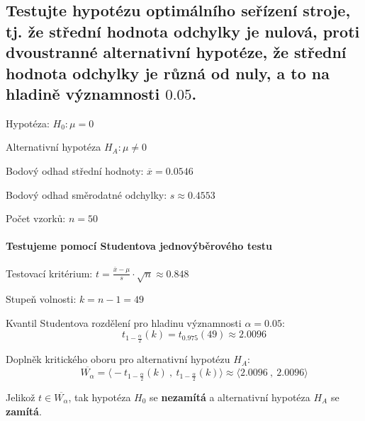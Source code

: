 
\subsection{Testujte hypotézu optimálního seřízení stroje, tj. že střední hodnota odchylky je nulová, proti dvoustranné alternativní hypotéze, že střední hodnota odchylky je různá od nuly, a to na hladině významnosti $0.05$.}

\begin{compactitem}
    \item Hypotéza: ${\displaystyle H_0 : \mu = 0}$

    \item Alternativní hypotéza ${\displaystyle H_{A} : \mu \neq 0}$

    \item Bodový odhad střední hodnoty: ${\displaystyle \overline{x} = 0.0546}$

    \item Bodový odhad směrodatné odchylky: ${\displaystyle s \approx 0.4553}$

    \item Počet vzorků: ${\displaystyle n = 50}$
\end{compactitem}

\paragraph*{Testujeme pomocí Studentova jednovýběrového testu}

\begin{compactitem}
    \item Testovací kritérium: ${\displaystyle t = \frac{\overline{x} - \mu}{s} \cdot \sqrt{n} \approx 0.848}$

    \item Stupeň volnosti: ${\displaystyle k = n - 1 = 49}$

    \item Kvantil Studentova rozdělení pro hladinu významnosti ${\displaystyle \alpha = 0.05}$:
    $${\displaystyle \qquad t_{1 - \frac{\alpha}{2}}(k) = t_{0.975}(49) \approx 2.0096}$$

    \item Doplněk kritického oboru pro alternativní hypotézu ${\displaystyle H_{A}}$:
    $${\displaystyle \qquad \overline{W_\alpha} = \big\langle -t_{1 - \frac{\alpha}{2}}(k) ~,~ t_{1 - \frac{\alpha}{2}}(k) \big\rangle \approx \big\langle 2.0096 ~,~ 2.0096 \big\rangle}$$

    \item Jelikož ${\displaystyle t \in \overline{W_\alpha}}$, tak hypotéza ${\displaystyle H_0}$ se \textbf{nezamítá} a alternativní hypotéza ${\displaystyle H_A}$ se \textbf{zamítá}.
\end{compactitem}

